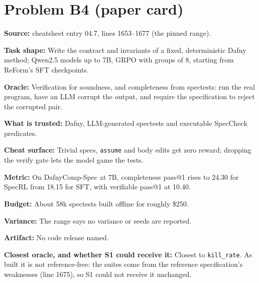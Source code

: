 \documentclass[11pt]{article}
\begin{document}
\section*{Problem B4 (paper card)}\label{ans:B4}
\begin{answer}
\textbf{Source:} cheatsheet entry 04.7, lines 1653--1677 (the pinned range).

\textbf{Task shape:} Write the contract and invariants of a fixed,
deterministic Dafny method; Qwen2.5 models up to 7B, GRPO with groups of 8,
starting from ReForm's SFT checkpoints.

\textbf{Oracle:} Verification for soundness, and completeness from spectests:
run the real program, have an LLM corrupt the output, and require the
specification to reject the corrupted pair.

\textbf{What is trusted:} Dafny, LLM-generated spectests and executable
SpecCheck predicates.

\textbf{Cheat surface:} Trivial specs, \texttt{assume} and body edits get zero
reward; dropping the verify gate lets the model game the tests.

\textbf{Metric:} On DafnyComp-Spec at 7B, completeness pass@1 rises to 24.30
for SpecRL from 18.15 for SFT, with verifiable pass@1 at 10.40.

\textbf{Budget:} About 58k spectests built offline for roughly \$250.

\textbf{Variance:} The range says no variance or seeds are reported.

\textbf{Artifact:} No code release named.

\textbf{Closest oracle, and whether S1 could receive it:} Closest to
\texttt{kill\_rate}. As built it is not reference-free: the suites come from
the reference specification's weaknesses (line 1675), so S1 could not receive
it unchanged.
\end{answer}

\end{document}
